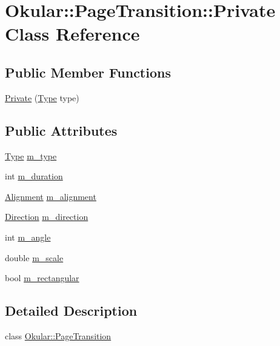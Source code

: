 \hypertarget{classPageTransition_1_1Private}{\section{Okular\+:\+:Page\+Transition\+:\+:Private Class Reference}
\label{classPageTransition_1_1Private}
}
\subsection*{Public Member Functions}
\begin{DoxyCompactItemize}
\item 
\hyperlink{classPageTransition_1_1Private_a75632f68b9cdd6aad98178e76d6e1ef1}{Private} (\hyperlink{classOkular_1_1PageTransition_a3e8b592a5a587ec0c3a9855d5d2687df}{Type} type)
\end{DoxyCompactItemize}
\subsection*{Public Attributes}
\begin{DoxyCompactItemize}
\item 
\hyperlink{classOkular_1_1PageTransition_a3e8b592a5a587ec0c3a9855d5d2687df}{Type} \hyperlink{classPageTransition_1_1Private_aee935e73b9f60a38c1eeb687abd64506}{m\+\_\+type}
\item 
int \hyperlink{classPageTransition_1_1Private_ade23bff4fd8086b8fa470c3288ed4559}{m\+\_\+duration}
\item 
\hyperlink{classOkular_1_1PageTransition_ab8b9f1414ab5aaf9d54c8952b0134ad9}{Alignment} \hyperlink{classPageTransition_1_1Private_a528c1d105fe62f42e6a6f2356dbd802f}{m\+\_\+alignment}
\item 
\hyperlink{classOkular_1_1PageTransition_a5b8bef87847dd9eef0c6b642180c93d9}{Direction} \hyperlink{classPageTransition_1_1Private_a5c9571d2d2a7c7702a63c8ae4608f107}{m\+\_\+direction}
\item 
int \hyperlink{classPageTransition_1_1Private_ae6054c8e811229d993f92ff283568ed9}{m\+\_\+angle}
\item 
double \hyperlink{classPageTransition_1_1Private_a196e45f3f2d1afc93d9056ce05bc77c2}{m\+\_\+scale}
\item 
bool \hyperlink{classPageTransition_1_1Private_ac9c3701391aeb80a7983a71a6eb82c54}{m\+\_\+rectangular}
\end{DoxyCompactItemize}


\subsection{Detailed Description}
class \hyperlink{classOkular_1_1PageTransition}{Okular\+::\+Page\+Transition} 

